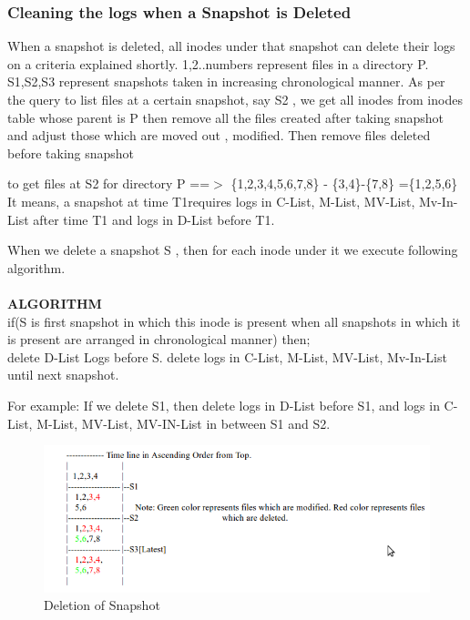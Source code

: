 \subsubsection{\textbf{Cleaning the logs when a Snapshot is Deleted}}

When a snapshot is deleted, all inodes under that snapshot can delete their logs on a criteria explained shortly. 1,2..numbers represent files in a directory P. S1,S2,S3 represent snapshots taken in increasing chronological manner. As per the query to list files at a certain snapshot, say S2 , we get all inodes from inodes table whose parent is P then remove all the files created after taking snapshot and adjust those which are moved out , modified. Then remove files deleted before taking snapshot 

to get files at S2 for directory P ==$>$ \{1,2,3,4,5,6,7,8\} - \{3,4\}-\{7,8\} =\{1,2,5,6\}
It means, a snapshot at time T1requires logs in C-List, M-List, MV-List, Mv-In-List after time T1 and logs in D-List before T1.

When we delete a snapshot S , then for each inode under it we execute following algorithm.\\\\
\textbf{ALGORITHM}\\
if(S is first snapshot in which this inode is present when all snapshots in which it is present are arranged in chronological manner) then;\\
\hspace{5em}delete D-List Logs before S. delete logs in C-List, M-List, MV-List, Mv-In-List until next snapshot.

For example: If we delete S1, then delete logs in D-List before S1, and logs in C-List, M-List, MV-List, MV-IN-List in between S1 and S2.\\

\begin{figure}[h!]
\centering  
 \includegraphics[scale=0.8]{figs/preliminar/Approach2.png}
  \caption{Deletion of Snapshot}
  \label{fig:approach2}
\end{figure}


